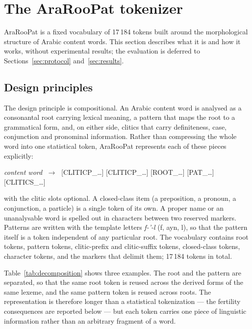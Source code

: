 \documentclass[a4paper,fleqn]{cas-sc}
\begin{document}
\section{The AraRooPat tokenizer}
\label{sec:tokenizer}

AraRooPat is a fixed vocabulary of 17\,184 tokens built around the morphological structure of Arabic content words. This section describes what it is and how it works, without experimental results; the evaluation is deferred to Sections~\ref{sec:protocol} and~\ref{sec:results}.

\subsection{Design principles}
\label{sec:tokenizer:design}

The design principle is compositional. An Arabic content word is analysed as a consonantal root carrying lexical meaning, a pattern that maps the root to a grammatical form, and, on either side, clitics that carry definiteness, case, conjunction and pronominal information. Rather than compressing the whole word into one statistical token, AraRooPat represents each of these pieces explicitly:

\begin{center}
\emph{content word} $\;\to\;$ [CLITICP\_\dots] [CLITICP\_\dots] [ROOT\_\dots] [PAT\_\dots] [CLITICS\_\dots]
\end{center}

with the clitic slots optional. A closed-class item (a preposition, a pronoun, a conjunction, a particle) is a single token of its own. A proper name or an unanalysable word is spelled out in characters between two reserved markers. Patterns are written with the template letters \emph{f-'-l} (f, ayn, l), so that the pattern itself is a token independent of any particular root. The vocabulary contains root tokens, pattern tokens, clitic-prefix and clitic-suffix tokens, closed-class tokens, character tokens, and the markers that delimit them; 17\,184 tokens in total.

Table~\ref{tab:decomposition} shows three examples. The root and the pattern are separated, so that the same root token is reused across the derived forms of the same lexeme, and the same pattern token is reused across roots. The representation is therefore longer than a statistical tokenization --- the fertility consequences are reported below --- but each token carries one piece of linguistic information rather than an arbitrary fragment of a word.
\end{document}
